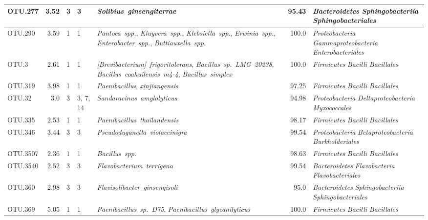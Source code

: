 \begin{ThreePartTable}
\begin{longtable}{P{1.5cm}rP{1cm}P{1.5cm}P{4cm}rP{5cm}}
OTU.277 & 3.52 & 3 & 3&\mbox{\textit{Solibius ginsengiterrae}} & 95.43 & \mbox{\textit{Bacteroidetes}} \mbox{\textit{Sphingobacteriia}} \mbox{\textit{Sphingobacteriales}} \\ \midrule
OTU.290 & 3.59 & 1 & 1&\mbox{\textit{Pantoea spp.}}, \mbox{\textit{Kluyvera spp.}}, \mbox{\textit{Klebsiella spp.}}, \mbox{\textit{Erwinia spp.}}, \mbox{\textit{Enterobacter spp.}}, \mbox{\textit{Buttiauxella spp.}} & 100.0 & \mbox{\textit{Proteobacteria}} \mbox{\textit{Gammaproteobacteria}} \mbox{\textit{Enterobacteriales}} \\ \midrule
OTU.3 & 2.61 & 1 & 1&\mbox{\textit{[Brevibacterium] frigoritolerans}}, \mbox{\textit{Bacillus sp. LMG 20238}}, \mbox{\textit{Bacillus coahuilensis m4-4}}, \mbox{\textit{Bacillus simplex}} & 100.0 & \mbox{\textit{Firmicutes}} \mbox{\textit{Bacilli}} \mbox{\textit{Bacillales}} \\ \midrule
OTU.319 & 3.98 & 1 & 1&\mbox{\textit{Paenibacillus xinjiangensis}} & 97.25 & \mbox{\textit{Firmicutes}} \mbox{\textit{Bacilli}} \mbox{\textit{Bacillales}} \\ \midrule
OTU.32 & 3.0 & 3 & 3, 7, 14&\mbox{\textit{Sandaracinus amylolyticus}} & 94.98 & \mbox{\textit{Proteobacteria}} \mbox{\textit{Deltaproteobacteria}} \mbox{\textit{Myxococcales}} \\ \midrule
OTU.335 & 2.53 & 1 & 1&\mbox{\textit{Paenibacillus thailandensis}} & 98.17 & \mbox{\textit{Firmicutes}} \mbox{\textit{Bacilli}} \mbox{\textit{Bacillales}} \\ \midrule
OTU.346 & 3.44 & 3 & 3&\mbox{\textit{Pseudoduganella violaceinigra}} & 99.54 & \mbox{\textit{Proteobacteria}} \mbox{\textit{Betaproteobacteria}} \mbox{\textit{Burkholderiales}} \\ \midrule
OTU.3507 & 2.36 & 1 & 1&\mbox{\textit{Bacillus spp.}} & 98.63 & \mbox{\textit{Firmicutes}} \mbox{\textit{Bacilli}} \mbox{\textit{Bacillales}} \\ \midrule
OTU.3540 & 2.52 & 3 & 3&\mbox{\textit{Flavobacterium terrigena}} & 99.54 & \mbox{\textit{Bacteroidetes}} \mbox{\textit{Flavobacteria}} \mbox{\textit{Flavobacteriales}} \\ \midrule
OTU.360 & 2.98 & 3 & 3&\mbox{\textit{Flavisolibacter ginsengisoli}} & 95.0 & \mbox{\textit{Bacteroidetes}} \mbox{\textit{Sphingobacteriia}} \mbox{\textit{Sphingobacteriales}} \\ \midrule
OTU.369 & 5.05 & 1 & 1&\mbox{\textit{Paenibacillus sp. D75}}, \mbox{\textit{Paenibacillus glycanilyticus}} & 100.0 & \mbox{\textit{Firmicutes}} \mbox{\textit{Bacilli}} \mbox{\textit{Bacillales}} \\ \midrule

\end{longtable}
\end{ThreePartTable}
